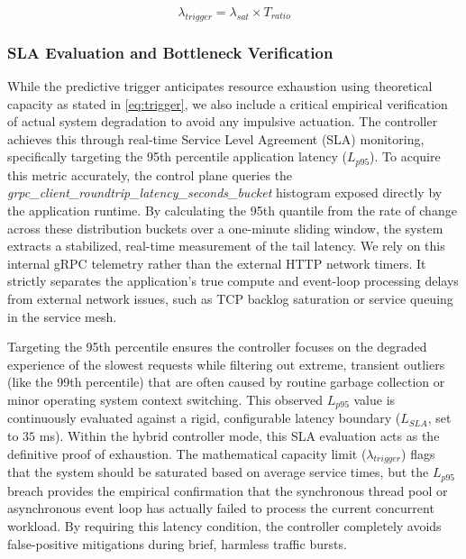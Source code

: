 \documentclass{ieeeaccess}
\begin{document}
	\begin{equation}
		\label{eq:trigger}
		\lambda_{trigger} = \lambda_{sat} \times T_{ratio}
	\end{equation}
	
	\subsubsection{SLA Evaluation and Bottleneck Verification} 
	While the predictive trigger anticipates resource exhaustion using theoretical capacity as stated in \eqref{eq:trigger}, we also include a critical empirical verification of actual system degradation to avoid any impulsive actuation. The controller achieves this through real-time Service Level Agreement (SLA) monitoring, specifically targeting the 95th percentile application latency ($L_{p95}$). To acquire this metric accurately, the control plane queries the \textit{grpc\_client\_roundtrip\_latency\_\break seconds\_bucket} histogram exposed directly by the application runtime. By calculating the 95th quantile from the rate of change across these distribution buckets over a one-minute sliding window, the system extracts a stabilized, real-time measurement of the tail latency. We rely on this internal gRPC telemetry rather than the external HTTP network timers. It strictly separates the application's true compute and event-loop processing delays from external network issues, such as TCP backlog saturation or service queuing in the service mesh.
	
	Targeting the 95th percentile ensures the controller focuses on the degraded experience of the slowest requests while filtering out extreme, transient outliers (like the 99th percentile) that are often caused by routine garbage collection or minor operating system context switching. This observed $L_{p95}$ value is continuously evaluated against a rigid, configurable latency boundary ($L_{SLA}$, set to $35$ ms). Within the hybrid controller mode, this SLA evaluation acts as the definitive proof of exhaustion. The mathematical capacity limit ($\lambda_{trigger}$) flags that the system should be saturated based on average service times, but the $L_{p95}$ breach provides the empirical confirmation that the synchronous thread pool or asynchronous event loop has actually failed to process the current concurrent workload. By requiring this latency condition, the controller completely avoids false-positive mitigations during brief, harmless traffic bursts.
	
	
	
\end{document}
